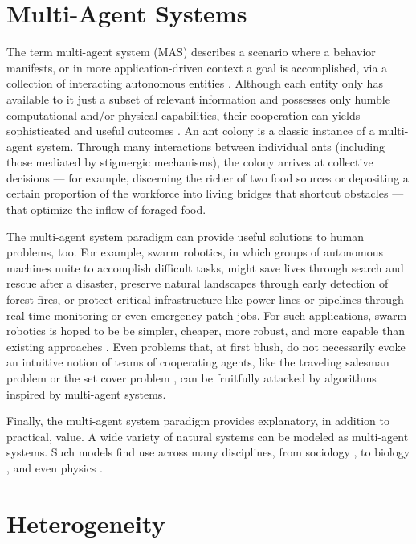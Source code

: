 \section{Multi-Agent Systems}

The term multi-agent system (MAS) describes a scenario where a behavior manifests, or in more application-driven context a goal is accomplished, via a collection of interacting autonomous entities \cite{ferber2003agents}.
Although each entity only has available to it just a subset of relevant information and possesses only humble computational and/or physical capabilities, their cooperation can yields sophisticated and useful outcomes  \cite{panait2005cooperative}.
An ant colony is a classic instance of a multi-agent system.
Through many interactions between individual ants (including those mediated by stigmergic mechanisms), the colony arrives at collective decisions --- for example, discerning the richer of two food sources \cite{beckers1993modulation} or depositing a certain proportion of the workforce into living bridges that shortcut obstacles \cite{graham2017optimal} --- that optimize the inflow of foraged food.

The multi-agent system paradigm can provide useful solutions to human problems, too.
For example, swarm robotics, in which groups of autonomous machines unite to accomplish difficult tasks, might save lives through search and rescue after a disaster, preserve natural landscapes through early detection of forest fires, or protect critical infrastructure like power lines or pipelines through real-time monitoring or even emergency patch jobs.
For such applications, swarm robotics is hoped to be be simpler, cheaper, more robust, and more capable than existing approaches \cite{tan2013research}.
Even problems that, at first blush, do not necessarily evoke an intuitive notion of teams of cooperating agents, like the traveling salesman problem \cite{dorigo1997ant, bnasin2013applications} or the set cover problem \cite{rahoual2002parallel,ren2010new}, can be fruitfully attacked by algorithms inspired by multi-agent systems.

Finally, the multi-agent system paradigm provides explanatory, in addition to practical, value.
A wide variety of natural systems can be modeled as multi-agent systems.
Such models find use across many disciplines, from sociology \cite{sawyer2003artificial}, to biology \cite{perna2012individual, amigoni2007multiagent}, and even physics \cite{vicsek1995novel}.

\section{Heterogeneity}


